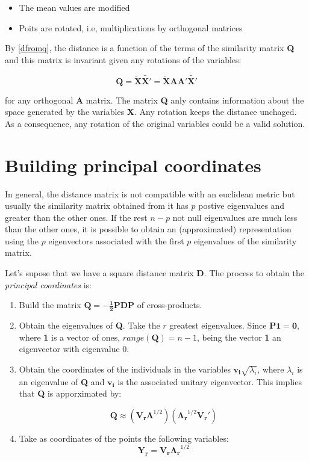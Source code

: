 \documentclass[11pt]{report}
\begin{document}
\begin{itemize}
\item The mean values are modified
\item Poits are rotated, i.e, multiplications by orthogonal matrices
\end{itemize}

\indent By \ref{dfromq}, the distance is a function of the terms of the 
similarity matrix \textbf{Q} and this matrix is invariant given any rotations of
the variables:

$$\mathbf{Q} = \mathbf{\widetilde{X}} \mathbf{\widetilde{X'}} = \mathbf{\widetilde{X}} \mathbf{A} \mathbf{A'}\mathbf{\widetilde{X'}}$$

for any orthogonal \textbf{A} matrix. The matrix \textbf{Q} anly contains 
information about the space generated by the variables \textbf{X}. Any rotation
keeps the distance unchaged. As a consequence, any rotation of the original 
variables could be a valid solution.


\section{Building principal coordinates}
In general, the distance matrix is not compatible with an euclidean metric but
usually the similarity matrix obtained from it has $p$ postive eigenvalues  
and greater than the other ones. If the rest $n-p$ not null eigenvalues 
are much less than the other ones, it is possible to obtain an (approximated)
representation using the $p$ eigenvectors associated with the first $p$
eigenvalues of the similarity matrix. 

\indent Let's supose that we have a square distance matrix \textbf{D}. The
process to obtain the \textit{principal coordinates} is:

\begin{enumerate}
\item Build the matrix $\mathbf{Q = - \frac{1}{2} PDP}$ of cross-products.
\item Obtain the eigenvalues of \textbf{Q}. Take the $r$ greatest eigenvalues. 
Since $\mathbf{P1=0}$, where \textbf{1} is a vector of ones, $range(\mathbf{Q})=n-1$,
being the vector \textbf{1} an eigenvector with eigenvalue 0.
\item Obtain the coordinates of the individuals in the variables $\mathbf{v_i}\sqrt{\lambda_i}$,
where $\lambda_i$ is an eigenvalue of \textbf{Q} and $\mathbf{v_i}$ is the
associated unitary eigenvector. This implies that \textbf{Q} is apporximated by:

$$\mathbf{Q} \approx (\mathbf{V_r \Lambda}^{1/2})(\mathbf{\Lambda_r}^{1/2} \mathbf{V_r'})$$

\item Take as coordinates of the points the following variables:
$$\mathbf{Y_r} = \mathbf{V_r}\mathbf{\Lambda_r}^{1/2}$$
\end{enumerate}
\end{document}
